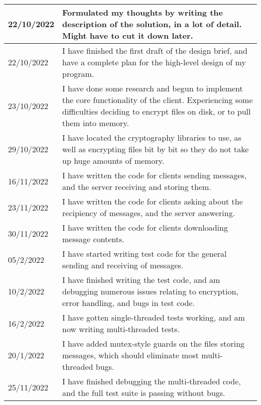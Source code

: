 \documentclass{article}
\begin{document}
\begin{longtable}{p{}p{}}
\midrule
22/10/2022 & Formulated my thoughts by writing the description of the solution, in a lot of detail. Might have to cut it down later.\\
\midrule
22/10/2022 & I have finished the first draft of the design brief, and have a complete plan for the high-level design of my program.\\
\midrule
23/10/2022 & I have done some research and begun to implement the core functionality of the client. Experiencing some difficulties deciding to encrypt files on disk, or to pull them into memory.\\
\midrule
29/10/2022 & I have located the cryptography libraries to use, as well as encrypting files bit by bit so they do not take up huge amounts of memory.\\
\midrule
16/11/2022 & I have written the code for clients sending messages, and the server receiving and storing them.\\
\midrule
23/11/2022 & I have written the code for clients asking about the recipiency of messages, and the server answering.\\
\midrule
30/11/2022 & I have written the code for clients downloading message contents.\\
\midrule
05/2/2022 & I have started writing test code for the general sending and receiving of messages.\\
\midrule
10/2/2022 & I have finished writing the test code, and am debugging numerous issues relating to encryption, error handling, and bugs in test code.\\
\midrule
16/2/2022 & I have gotten single-threaded tests working, and am now writing multi-threaded tests.\\
\midrule
20/1/2022 & I have added mutex-style guards on the files storing messages, which should eliminate most multi-threaded bugs.\\
\midrule
25/11/2022 & I have finished debugging the multi-threaded code, and the full test suite is passing without bugs.\\
\bottomrule
\end{longtable}
\end{document}
